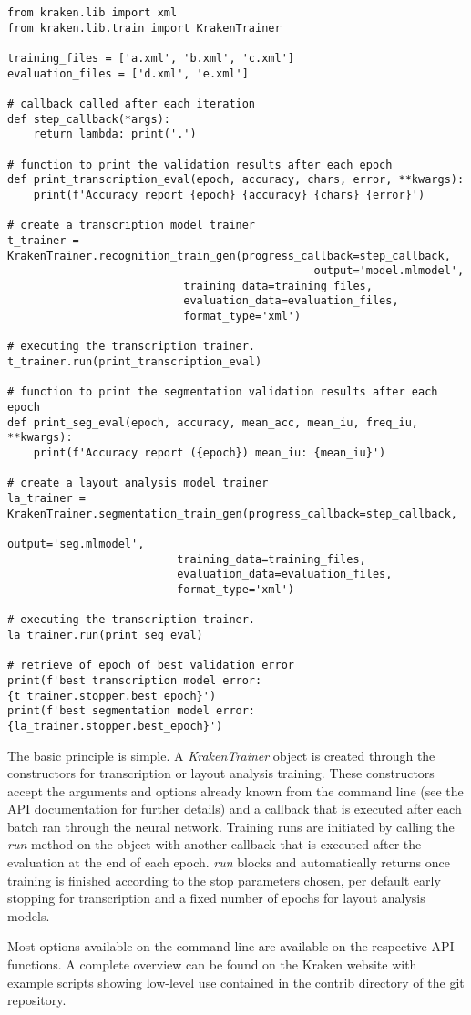 \begin{verbatim}
from kraken.lib import xml
from kraken.lib.train import KrakenTrainer

training_files = ['a.xml', 'b.xml', 'c.xml']
evaluation_files = ['d.xml', 'e.xml']

# callback called after each iteration 
def step_callback(*args):
    return lambda: print('.')

# function to print the validation results after each epoch
def print_transcription_eval(epoch, accuracy, chars, error, **kwargs):
    print(f'Accuracy report {epoch} {accuracy} {chars} {error}')

# create a transcription model trainer
t_trainer = KrakenTrainer.recognition_train_gen(progress_callback=step_callback,
                                               output='model.mlmodel',
 					       training_data=training_files,
 					       evaluation_data=evaluation_files,
					       format_type='xml')

# executing the transcription trainer.
t_trainer.run(print_transcription_eval)

# function to print the segmentation validation results after each epoch
def print_seg_eval(epoch, accuracy, mean_acc, mean_iu, freq_iu, **kwargs):
    print(f'Accuracy report ({epoch}) mean_iu: {mean_iu}')

# create a layout analysis model trainer
la_trainer = KrakenTrainer.segmentation_train_gen(progress_callback=step_callback,
                                                  output='seg.mlmodel',
						  training_data=training_files,
						  evaluation_data=evaluation_files,
						  format_type='xml')

# executing the transcription trainer.
la_trainer.run(print_seg_eval)

# retrieve of epoch of best validation error
print(f'best transcription model error: {t_trainer.stopper.best_epoch}')
print(f'best segmentation model error: {la_trainer.stopper.best_epoch}')
\end{verbatim}

The basic principle is simple. A \emph{KrakenTrainer} object is created through
the constructors for transcription or layout analysis training. These
constructors accept the arguments and options already known from the command
line (see the API documentation for further details) and a callback that is
executed after each batch ran through the neural network.  Training runs are
initiated by calling the \emph{run} method on the object with another
callback that is executed after the evaluation at the end of each epoch.
\emph{run} blocks and automatically returns once training is finished
according to the stop parameters chosen, per default early stopping for
transcription and a fixed number of epochs for layout analysis models.

Most options available on the command line are available on the respective API
functions. A complete overview can be found on the Kraken website with example
scripts showing low-level use contained in the contrib directory of the git
repository.
